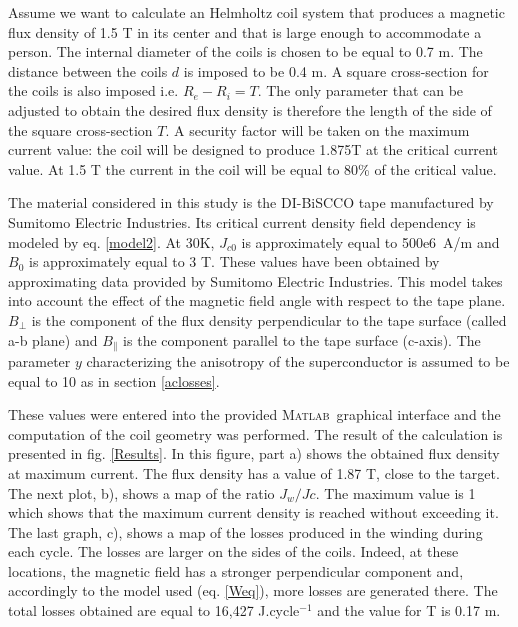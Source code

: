 \documentclass{ws-jmrr}
\newcommand{\MATLAB}{{\textsc{Matlab}}}
\begin{document}
\begin{multicols}{2}
Assume we want to calculate an Helmholtz coil system that produces a magnetic flux density of 1.5 T in its center and that is large enough to accommodate a person. The internal diameter of the coils is chosen to be equal to 0.7 m. The distance between the coils $d$ is imposed to be 0.4 m. A square cross-section for the coils is also imposed i.e. $R_e-R_i=T$. The only parameter that can be adjusted to obtain the desired flux density is therefore the length of the side of the square cross-section $T$. A security factor will be taken on the maximum current value: the coil will be designed to produce 1.875T at the critical current value. At 1.5 T the current in the coil will be equal to 80\% of the critical value.\par
The material considered in this study is the DI-BiSCCO tape manufactured by Sumitomo Electric Industries. Its critical current density field dependency is modeled by eq. \ref{model2}. At 30K, $J_{c0}$ is approximately equal to 500e6~A/m and $B_0$ is approximately equal to 3 T. These values have been obtained by approximating data provided by Sumitomo Electric Industries. This model takes into account the effect of the magnetic field angle with respect to the tape plane. $B_{\perp}$ is the component of the flux density perpendicular to the tape surface (called a-b plane) and $B_{\parallel}$ is the component parallel to the tape surface (c-axis). The parameter $y$ characterizing the anisotropy of the superconductor is assumed to be equal to 10 as in section \ref{aclosses}.\par
These values were entered into the provided \MATLAB ~graphical interface and the computation of the coil geometry was performed. The result of the calculation is presented in fig. \ref{Results}. In this figure, part a) shows the obtained flux density at maximum current. The flux density has a value of 1.87 T, close to the target. The next plot, b), shows a map of the ratio $J_w/Jc$. The maximum value is 1 which shows that the maximum current density is reached without exceeding it. The last graph, c), shows a map of the losses produced in the winding during each cycle. The losses are larger on the sides of the coils. Indeed, at these locations, the magnetic field has a stronger perpendicular component and, accordingly to the model used (eq. \ref{Weq}), more losses are generated there. The total losses obtained are equal to 16,427 J.cycle$^{-1}$ and the value for T is 0.17 m.

\end{multicols}
\end{document}
